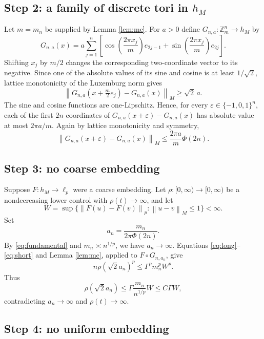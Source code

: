 \documentclass[11pt]{article}
\newcommand{\Z}{\mathbb{Z}}
\newcommand{\norm}[1]{\left\lVert #1\right\rVert}
\begin{document}
\subsection*{Step 2: a family of discrete tori in $h_M$}

Let $m=m_n$ be supplied by Lemma \ref{lem:mc}.  For $a>0$ define
$G_{n,a}:\Z_m^n\to h_M$ by
\[
 G_{n,a}(x)=a\sum_{j=1}^n\left[
 \cos\!\left(\frac{2\pi x_j}{m}\right)e_{2j-1}
 +\sin\!\left(\frac{2\pi x_j}{m}\right)e_{2j}\right].
\]
Shifting $x_j$ by $m/2$ changes the corresponding two-coordinate vector to
its negative.  Since one of the absolute values of its sine and cosine is at
least $1/\sqrt2$, lattice monotonicity of the Luxemburg norm gives
\begin{equation}\label{eq:long}
 \norm{G_{n,a}(x+\tfrac m2e_j)-G_{n,a}(x)}_M\ge\sqrt2\,a.
\end{equation}
The sine and cosine functions are one-Lipschitz.  Hence, for every
$\varepsilon\in\{-1,0,1\}^n$, each of the first $2n$ coordinates of
$G_{n,a}(x+\varepsilon)-G_{n,a}(x)$ has absolute value at most
$2\pi a/m$.  Again by lattice monotonicity and symmetry,
\begin{equation}\label{eq:short}
 \norm{G_{n,a}(x+\varepsilon)-G_{n,a}(x)}_M
 \le \frac{2\pi a}{m}\Phi(2n).
\end{equation}

\subsection*{Step 3: no coarse embedding}

Suppose $F:h_M\to\ell_p$ were a coarse embedding.  Let
$\rho:[0,\infty)\to[0,\infty)$ be a nondecreasing lower control with
$\rho(t)\to\infty$, and let
\[
 W=\sup\{\norm{F(u)-F(v)}_p:\norm{u-v}_M\le1\}<\infty.
\]
Set
\[
 a_n=\frac{m_n}{2\pi\Phi(2n)}.
\]
By \eqref{eq:fundamental} and $m_n\asymp n^{1/p}$, we have
$a_n\to\infty$.  Equations \eqref{eq:long}--\eqref{eq:short} and
Lemma \ref{lem:mc}, applied to $F\circ G_{n,a_n}$, give
\[
 n\rho(\sqrt2a_n)^p
 \le \Gamma^p m_n^p W^p.
\]
Thus
\[
 \rho(\sqrt2a_n)
 \le \Gamma\frac{m_n}{n^{1/p}}W\le C\Gamma W,
\]
contradicting $a_n\to\infty$ and $\rho(t)\to\infty$.

\subsection*{Step 4: no uniform embedding}
\end{document}
